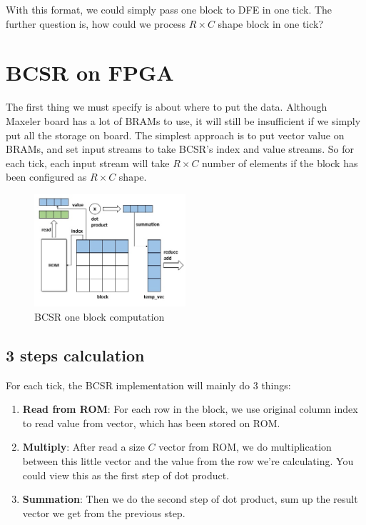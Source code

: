 \documentclass[a4paper, 10pt]{report}
\begin{document}
With this format, we could simply pass one block to DFE in one tick. The further question is, how could we process $R\times C$ shape block in one tick?

\section{BCSR on FPGA}

The first thing we must specify is about where to put the data. Although Maxeler board has a lot of BRAMs to use, it will still be insufficient if we simply put all the storage on board. The simplest approach is to put vector value on BRAMs, and set input streams to take BCSR's index and value streams. So for each tick, each input stream will take $R\times C$ number of elements if the block has been configured as $R\times C$ shape.

\begin{figure}[h!]
  \caption{BCSR one block computation}
  \centering
    \includegraphics[width=0.5\textwidth]{bcsr}
\end{figure}

\subsection{3 steps calculation}
For each tick, the BCSR implementation will mainly do 3 things:
\begin{enumerate}
\item \textbf{Read from ROM}: For each row in the block, we use original column index to read value from vector, which has been stored on ROM.
\item \textbf{Multiply}: After read a size $C$ vector from ROM, we do multiplication between this little vector and the value from the row we're calculating. You could view this as the first step of dot product.
\item \textbf{Summation}: Then we do the second step of dot product, sum up the result vector we get from the previous step.
\end{enumerate}
\end{document}
